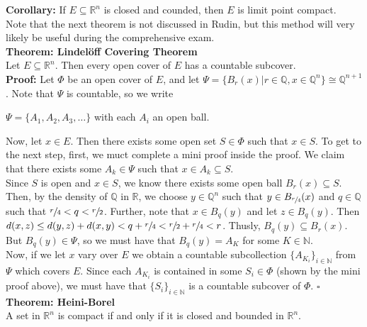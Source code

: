 \documentclass{article}
\begin{document}
\textbf{Corollary:} If $E \subseteq \mathbb{R}^n$ is closed and counded, then $E$ is limit point compact.\\

Note that the next theorem is not discussed in Rudin, but this method will very likely be useful during the comprehensive exam.\\

\textbf{Theorem: Lindel\"off Covering Theorem}\\
Let $E \subseteq \mathbb{R}^n$. Then every open cover of $E$ has a countable subcover.\\

\textbf{Proof:} Let $\Phi$ be an open cover of $E$, and let $\Psi=\{B_r(x) \big| r \in \mathbb{Q}, x \in \mathbb{Q}^n\} \cong \mathbb{Q}^{n+1}$. Note that $\Psi$ is countable, so we write
\begin{center}
    $\Psi = \{A_1, A_2, A_3, \dots\}$ with each $A_i$ an open ball. 
\end{center}
Now, let $x \in E$. Then there exists some open set $S \in \Phi$ such that $x \in S$. To get to the next step, first, we muct complete a mini proof inside the proof. We claim that there exists some $A_k \in \Psi$ such that $x \in A_k \subseteq S$. \\

Since $S$ is open and $x \in S$, we know there exists some open ball $B_r(x) \subseteq S$. Then, by the density of $\mathbb{Q}$ in $\mathbb{R}$, we choose $y \in \mathbb{Q}^n$ such that $y \in B_{\sfrac{r}{4}}(x)$ and $q \in \mathbb{Q}$ such that $\sfrac{r}{4} < q < \sfrac{r}{2}$. Further, note that $x \in B_q(y)$ and let $z \in B_q(y)$. Then $d(x,z) \leq d(y,z)+d(x,y)<q+\sfrac{r}{4}<\sfrac{r}{2}+\sfrac{r}{4}<r$. Thusly, $B_q(y) \subseteq B_r(x)$. But $B_q(y) \in \Psi$, so we must have that $B_q(y)=A_K$ for some $K \in \mathbb{N}$. \\

Now, if we let $x$ vary over $E$ we obtain a countable subcollection $\{A_{K_i}\}_{i \in \mathbb{N}}$ from $\Psi$ which covers $E$. Since each $A_{K_i}$ is contained in some $S_i \in \Phi$ (shown by the mini proof above), we must have that $\{S_i\}_{i \in \mathbb{N}}$ is a countable subcover of $\Phi$. $\square$\\

\textbf{Theorem: Heini-Borel}\\
A set in $\mathbb{R}^n$ is compact if and only if it is closed and bounded in $\mathbb{R}^n$.\\
\end{document}
